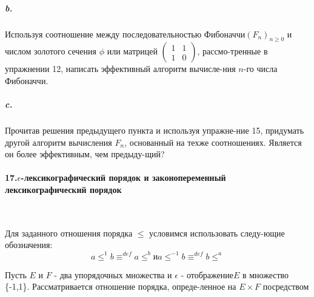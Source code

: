 \documentclass{mai_book}
\begin{document}
\newpage
\subparagraph { b.} Используя соотношение между последовательностью Фибоначчи\linebreak ${\left({F_n}\right)}_{n\geq{0}}$ и числом золотого сечения $\phi$ или матрицей $\begin{pmatrix}1 & 1 \\ 1 & 0 \end{pmatrix}$, рассмо-\linebreak тренные в упражнении 12, написать эффективный алгоритм вычисле-\linebreak ния $n$-го числа Фибоначчи.

\subparagraph { c.} Прочитав решения предыдущего пункта и используя упражне-\linebreak ние 15, придумать другой алгоритм вычисления $F_{n}$, основанный на тех\linebreak же соотношениях. Является он более эффективным, чем предыду-\linebreak щий? 

\paragraph { 17.$\epsilon$-лексикографический порядок и законопеременный лексикографический порядок}\ \newline

Для заданного отношения порядка $\leq$ условимся использовать следу-\linebreak ющие обозначения:
\begin{equation*}
a\leq^{1}b \equiv^{def} a\leq^{b}  \text{и}   a\leq^{-1}b \equiv^{def} b\leq^{a}
\end{equation*}

Пусть $E$ и $F$ - два упорядочных множества и $\epsilon$ - отображение\linebreak $E$ в множество      
\{-1,1\}. Рассматривается отношение порядка, опреде-\linebreak ленное на $E\times{F}$ посредством 
\end{document}

